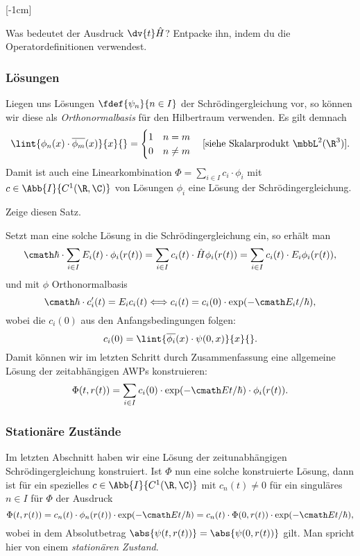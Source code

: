 \documentclass{subfiles}
\begin{document}
    [-1cm]
    \begin{Aufgabe}
        \nr{} Was bedeutet der Ausdruck $\dv{t}\hat H$? Entpacke ihn, indem du die Operatordefinitionen verwendest. 
    \end{Aufgabe}
    \subsubsection*{Lösungen}
        Liegen uns Lösungen $\fdef{\psi_n}{n\in I}$ der Schrödingergleichung vor, so können wir diese als \emph{Orthonormalbasis} für den Hilbertraum verwenden. Es gilt demnach
        \[\lint{\phi_n(x)\cdot\overline{\phi_m}(x)}{x}{} = \begin{cases}
            1 & n=m\\
            0 & n\neq m
        \end{cases}\quad [\text{siehe Skalarprodukt }\mbbL^2(\R^3)].\]
        Damit ist auch eine Linearkombination $\Phi = \sum_{i\in I}c_i\cdot\phi_i$ mit $c\in\Abb{I}{C^1(\R,\C)}$ von Lösungen $\phi_i$ eine Lösung der Schrödingergleichung. \\
        \begin{Aufgabe}
            \nr{} Zeige diesen Satz. 
        \end{Aufgabe}
        \noindent Setzt man eine solche Lösung in die Schrödingergleichung ein, so erhält man
        \[\cmath\hbar\cdot\sum_{i\in I}E_i(t)\cdot\phi_i(r(t)) = \sum_{i\in I}c_i(t)\cdot\hat H\phi_i(r(t)) = \sum_{i\in I}c_i(t)\cdot E_i\phi_i(r(t)),\]
        und mit $\phi$ Orthonormalbasis 
        \[\cmath\hbar\cdot c_i'(t) = E_i c_i(t) \Longleftrightarrow c_i(t) = c_i(0)\cdot\exp(-\cmath E_i t/\hbar),\]
        wobei die $c_i(0)$ aus den Anfangsbedingungen folgen:
        \[c_i(0) = \lint{\overline{\phi_i}(x)\cdot\psi(0,x)}{x}{}.\]
        Damit können wir im letzten Schritt durch Zusammenfassung eine allgemeine Lösung der zeitabhängigen AWPs konstruieren:
        \[\Phi(t,r(t)) = \sum_{i\in I}c_i(0)\cdot\exp(-\cmath E t/\hbar)\cdot\phi_i(r(t)).\]

    \subsubsection{Stationäre Zustände}
        Im letzten Abschnitt haben wir eine Lösung der zeitunabhängigen Schrödingergleichung konstruiert. Ist $\Phi$ nun eine solche konstruierte Lösung, dann ist für ein spezielles $c\in\Abb{I}{C^1(\R,\C)}$ mit $c_n(t)\neq 0$ für ein singuläres $n\in I$ für $\Phi$ der Ausdruck
        \[\Phi(t,r(t)) = c_n(t)\cdot \phi_n(r(t))\cdot \exp(-\cmath Et/\hbar) = c_n(t)\cdot\Phi(0,r(t))\cdot\exp(-\cmath Et/\hbar),\]
        wobei in dem Absolutbetrag $\abs{\psi(t,r(t))} = \abs{\psi(0,r(t))}$ gilt. Man spricht hier von einem \emph{stationären Zustand}.
\end{document}
